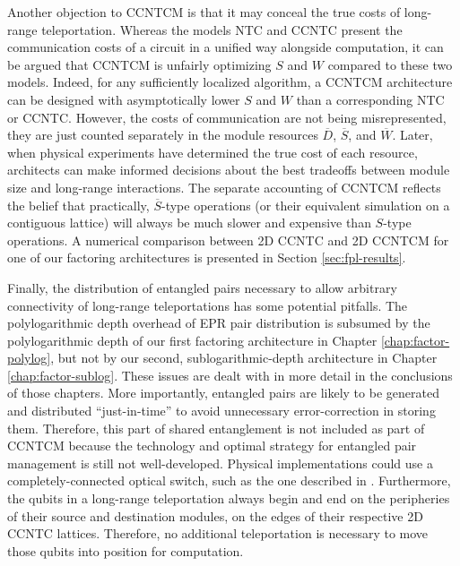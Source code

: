 Another objection to \textsf{CCNTCM} is that it may conceal the true
costs of long-range teleportation. Whereas the models \textsf{NTC} and
\textsf{CCNTC} present the communication costs of a circuit in a unified
way alongside computation, it can be argued that \textsf{CCNTCM} is unfairly
optimizing $S$ and $W$ compared to these two models. Indeed, for any
sufficiently localized algorithm, a \textsf{CCNTCM} architecture can be designed with asymptotically lower $S$ and $W$ than a corresponding \textsf{NTC} or \textsf{CCNTC}. However, the costs of communication are not being
misrepresented, they are just counted separately
in the module resources $\overline{D}$, $\overline{S}$, and
$\overline{W}$. Later, when physical experiments have determined the
true cost of each resource, architects can make informed decisions about
the best tradeoffs between module size and long-range interactions.
The separate accounting of \textsf{CCNTCM} reflects the belief that
practically, $\overline{S}$-type operations (or their equivalent simulation
on a contiguous lattice) will always be much slower
and expensive than $S$-type operations. A numerical comparison between
\textsf{2D CCNTC} and \textsf{2D CCNTCM} for one of our
factoring architectures is presented in Section \ref{sec:fpl-results}.

Finally, the distribution of entangled pairs necessary to allow
arbitrary connectivity of long-range teleportations has some
potential pitfalls. The polylogarithmic depth overhead
of EPR pair distribution is subsumed by the polylogarithmic
depth of our first factoring architecture in
Chapter \ref{chap:factor-polylog}, but not by our
second, sublogarithmic-depth architecture in
Chapter \ref{chap:factor-sublog}. These issues are
dealt with in more detail in the conclusions of those chapters.
More importantly, entangled pairs are likely to be generated
and distributed ``just-in-time'' to avoid unnecessary
error-correction in storing them.
Therefore, this part of shared entanglement is not included as part
of \textsf{CCNTCM} because
the technology and optimal strategy for entangled pair management
is still not well-developed.
Physical implementations could use a completely-connected
optical switch, such as the one described in \cite{Monroe2012}.
Furthermore, the qubits in a long-range teleportation always begin and end
on the peripheries of their source and destination modules,
on the edges of their respective \textsf{2D CCNTC} lattices.
Therefore, no additional teleportation is necessary to move
those qubits into position for computation.

